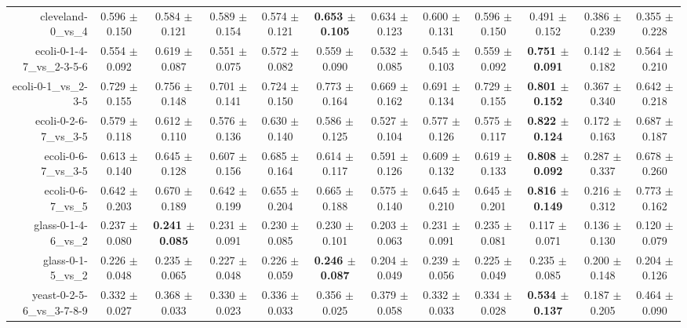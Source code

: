 \begin{table}[!ht]
{\begin{tabular}{r c c c c c c c c c c c}
cleveland-0\_vs\_4 & 0.596 $\pm$ 0.150 & 0.584 $\pm$ 0.121 & 0.589 $\pm$ 0.154 & 0.574 $\pm$ 0.121 & \textbf{0.653 $\pm$ 0.105} & 0.634 $\pm$ 0.123 & 0.600 $\pm$ 0.131 & 0.596 $\pm$ 0.150 & 0.491 $\pm$ 0.152 & 0.386 $\pm$ 0.239 & 0.355 $\pm$ 0.228 \\
ecoli-0-1-4-7\_vs\_2-3-5-6 & 0.554 $\pm$ 0.092 & 0.619 $\pm$ 0.087 & 0.551 $\pm$ 0.075 & 0.572 $\pm$ 0.082 & 0.559 $\pm$ 0.090 & 0.532 $\pm$ 0.085 & 0.545 $\pm$ 0.103 & 0.559 $\pm$ 0.092 & \textbf{0.751 $\pm$ 0.091} & 0.142 $\pm$ 0.182 & 0.564 $\pm$ 0.210 \\
ecoli-0-1\_vs\_2-3-5 & 0.729 $\pm$ 0.155 & 0.756 $\pm$ 0.148 & 0.701 $\pm$ 0.141 & 0.724 $\pm$ 0.150 & 0.773 $\pm$ 0.164 & 0.669 $\pm$ 0.162 & 0.691 $\pm$ 0.134 & 0.729 $\pm$ 0.155 & \textbf{0.801 $\pm$ 0.152} & 0.367 $\pm$ 0.340 & 0.642 $\pm$ 0.218 \\
ecoli-0-2-6-7\_vs\_3-5 & 0.579 $\pm$ 0.118 & 0.612 $\pm$ 0.110 & 0.576 $\pm$ 0.136 & 0.630 $\pm$ 0.140 & 0.586 $\pm$ 0.125 & 0.527 $\pm$ 0.104 & 0.577 $\pm$ 0.126 & 0.575 $\pm$ 0.117 & \textbf{0.822 $\pm$ 0.124} & 0.172 $\pm$ 0.163 & 0.687 $\pm$ 0.187 \\
ecoli-0-6-7\_vs\_3-5 & 0.613 $\pm$ 0.140 & 0.645 $\pm$ 0.128 & 0.607 $\pm$ 0.156 & 0.685 $\pm$ 0.164 & 0.614 $\pm$ 0.117 & 0.591 $\pm$ 0.126 & 0.609 $\pm$ 0.132 & 0.619 $\pm$ 0.133 & \textbf{0.808 $\pm$ 0.092} & 0.287 $\pm$ 0.337 & 0.678 $\pm$ 0.260 \\
ecoli-0-6-7\_vs\_5 & 0.642 $\pm$ 0.203 & 0.670 $\pm$ 0.189 & 0.642 $\pm$ 0.199 & 0.655 $\pm$ 0.204 & 0.665 $\pm$ 0.188 & 0.575 $\pm$ 0.140 & 0.645 $\pm$ 0.210 & 0.645 $\pm$ 0.201 & \textbf{0.816 $\pm$ 0.149} & 0.216 $\pm$ 0.312 & 0.773 $\pm$ 0.162 \\
glass-0-1-4-6\_vs\_2 & 0.237 $\pm$ 0.080 & \textbf{0.241 $\pm$ 0.085} & 0.231 $\pm$ 0.091 & 0.230 $\pm$ 0.085 & 0.230 $\pm$ 0.101 & 0.203 $\pm$ 0.063 & 0.231 $\pm$ 0.091 & 0.235 $\pm$ 0.081 & 0.117 $\pm$ 0.071 & 0.136 $\pm$ 0.130 & 0.120 $\pm$ 0.079 \\
glass-0-1-5\_vs\_2 & 0.226 $\pm$ 0.048 & 0.235 $\pm$ 0.065 & 0.227 $\pm$ 0.048 & 0.226 $\pm$ 0.059 & \textbf{0.246 $\pm$ 0.087} & 0.204 $\pm$ 0.049 & 0.239 $\pm$ 0.056 & 0.225 $\pm$ 0.049 & 0.235 $\pm$ 0.085 & 0.200 $\pm$ 0.148 & 0.204 $\pm$ 0.126 \\
yeast-0-2-5-6\_vs\_3-7-8-9 & 0.332 $\pm$ 0.027 & 0.368 $\pm$ 0.033 & 0.330 $\pm$ 0.023 & 0.336 $\pm$ 0.033 & 0.356 $\pm$ 0.025 & 0.379 $\pm$ 0.058 & 0.332 $\pm$ 0.033 & 0.334 $\pm$ 0.028 & \textbf{0.534 $\pm$ 0.137} & 0.187 $\pm$ 0.205 & 0.464 $\pm$ 0.090 \\

\end{tabular}}
\end{table}
